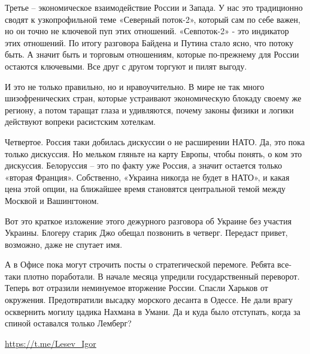 Третье – экономическое взаимодействие России и Запада. У нас это традиционно
сводят к узкопрофильной теме «Северный поток-2», который сам по себе важен, но
он точно не ключевой пуп этих отношений. «Севпоток-2» - это индикатор этих
отношений. По итогу разговора Байдена и Путина стало ясно, что потоку быть. А
значит быть и торговым отношениям, которые по-прежнему для России остаются
ключевыми. Все друг с другом торгуют и пилят выгоду.

И это не только правильно, но и нравоучительно. В мире не так много
шизофренических стран, которые устраивают экономическую блокаду своему же
региону, а потом таращат глаза и удивляются, почему законы физики и логики
действуют вопреки расистским хотелкам.

Четвертое. Россия таки добилась дискуссии о не расширении НАТО. Да, это пока
только дискуссия. Но мельком гляньте на карту Европы, чтобы понять, о ком это
дискуссия. Белоруссия – это по факту уже Россия, а значит остается только
«вторая Франция». Собственно, «Украина никогда не будет в НАТО», и какая цена
этой опции, на ближайшее время становятся центральной темой между Москвой и
Вашингтоном.

Вот это краткое изложение этого дежурного разговора об Украине без участия
Украины. Блогеру старик Джо обещал позвонить в четверг. Передаст привет,
возможно, даже не спутает имя.

А в Офисе пока могут строчить посты о стратегической перемоге. Ребята все-таки
плотно поработали. В начале месяца упредили государственный переворот. Теперь
вот отразили неминуемое вторжение России. Спасли Харьков от окружения.
Предотвратили высадку морского десанта в Одессе. Не дали врагу осквернить
могилу цадика Нахмана в Умани. Да и куда было отступать, когда за спиной
оставался только Лемберг?

\url{https://t.me/Lesev_Igor}

